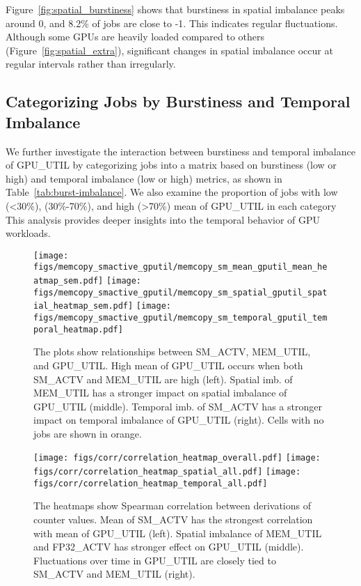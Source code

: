 Figure~\ref{fig:spatial_burstiness} shows that burstiness in spatial imbalance
peaks around 0, and 8.2\% of jobs are close to -1. This indicates regular
fluctuations. Although some GPUs are heavily loaded compared to
others (Figure~\ref{fig:spatial_extra}), significant changes in spatial imbalance
occur at regular intervals rather than irregularly.

\subsection{Categorizing Jobs by Burstiness and Temporal Imbalance}

We further investigate the interaction between burstiness and temporal imbalance
of GPU\_UTIL by categorizing jobs into a matrix based on burstiness (low
or high) and temporal imbalance (low or high) metrics, as shown in
Table~\ref{tab:burst-imbalance}. We also examine the proportion of jobs
with low (\textless30\%), (30\%-70\%), and high (\textgreater70\%) mean
of GPU\_UTIL in each category This analysis provides deeper insights into
the temporal behavior of GPU workloads.

\begin{figure*}[t]
    \centering
    \texttt{[image: figs/memcopy\_smactive\_gputil/memcopy\_sm\_mean\_gputil\_mean\_heatmap\_sem.pdf]}
    \texttt{[image: figs/memcopy\_smactive\_gputil/memcopy\_sm\_spatial\_gputil\_spatial\_heatmap\_sem.pdf]}
    \texttt{[image: figs/memcopy\_smactive\_gputil/memcopy\_sm\_temporal\_gputil\_temporal\_heatmap.pdf]}
    \caption{The plots show relationships between SM\_ACTV,
        MEM\_UTIL, and GPU\_UTIL.
        High mean of GPU\_UTIL occurs when both SM\_ACTV and MEM\_UTIL are high (left).
        Spatial imb. of MEM\_UTIL has a stronger impact on spatial imbalance of
        GPU\_UTIL (middle).
        Temporal imb. of SM\_ACTV has a stronger impact on temporal imbalance
        of GPU\_UTIL (right).
        Cells with no jobs are shown in orange.}
    \label{fig:memcopy_sm_spatial_gputil}
\end{figure*}

\begin{figure*}[t]
    \centering
    \texttt{[image: figs/corr/correlation\_heatmap\_overall.pdf]}
    \texttt{[image: figs/corr/correlation\_heatmap\_spatial\_all.pdf]}
    \texttt{[image: figs/corr/correlation\_heatmap\_temporal\_all.pdf]}
    \caption{The heatmaps show Spearman correlation between derivations of counter values.
        Mean of SM\_ACTV has the strongest correlation with mean of GPU\_UTIL (left).
        Spatial imbalance of MEM\_UTIL and FP32\_ACTV has stronger effect on GPU\_UTIL (middle).
        Fluctuations over time in GPU\_UTIL are closely tied to SM\_ACTV and MEM\_UTIL (right).}
    \label{fig:correlations}
\end{figure*}

